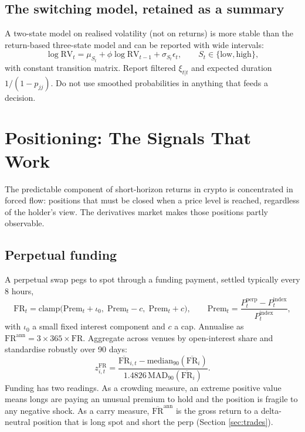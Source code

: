 \documentclass[11pt,a4paper]{article}
\theoremstyle{definition}
\begin{document}
\subsection{The switching model, retained as a summary}

A two-state model on realised volatility (not on returns) is more stable than the return-based three-state model and can be reported with wide intervals:
\begin{equation}
\log \mathrm{RV}_t = \mu_{S_t} + \phi \log \mathrm{RV}_{t-1} + \sigma_{S_t}\epsilon_t, \qquad S_t \in \{\text{low},\text{high}\},
\end{equation}
with constant transition matrix. Report filtered $\xi_{t|t}$ and expected duration $1/(1 - p_{jj})$. Do not use smoothed probabilities in anything that feeds a decision.

\section{Positioning: The Signals That Work}\label{sec:positioning}

The predictable component of short-horizon returns in crypto is concentrated in forced flow: positions that must be closed when a price level is reached, regardless of the holder's view. The derivatives market makes those positions partly observable.

\subsection{Perpetual funding}

A perpetual swap pegs to spot through a funding payment, settled typically every 8 hours,
\begin{equation}
\mathrm{FR}_t = \mathrm{clamp}\big(\mathrm{Prem}_t + \iota_0,\; \mathrm{Prem}_t - c,\; \mathrm{Prem}_t + c\big), \qquad \mathrm{Prem}_t = \frac{P^{\mathrm{perp}}_t - P^{\mathrm{index}}_t}{P^{\mathrm{index}}_t},
\end{equation}
with $\iota_0$ a small fixed interest component and $c$ a cap. Annualise as $\mathrm{FR}^{\mathrm{ann}} = 3 \times 365 \times \mathrm{FR}$. Aggregate across venues by open-interest share and standardise robustly over 90 days:
\begin{equation}
z^{\mathrm{FR}}_{i,t} = \frac{\overline{\mathrm{FR}}_{i,t} - \mathrm{median}_{90}(\overline{\mathrm{FR}}_i)}{1.4826\,\mathrm{MAD}_{90}(\overline{\mathrm{FR}}_i)}.
\end{equation}
Funding has two readings. As a crowding measure, an extreme positive value means longs are paying an unusual premium to hold and the position is fragile to any negative shock. As a carry measure, $\overline{\mathrm{FR}}^{\mathrm{ann}}$ is the gross return to a delta-neutral position that is long spot and short the perp (Section \ref{sec:trades}).
\end{document}
